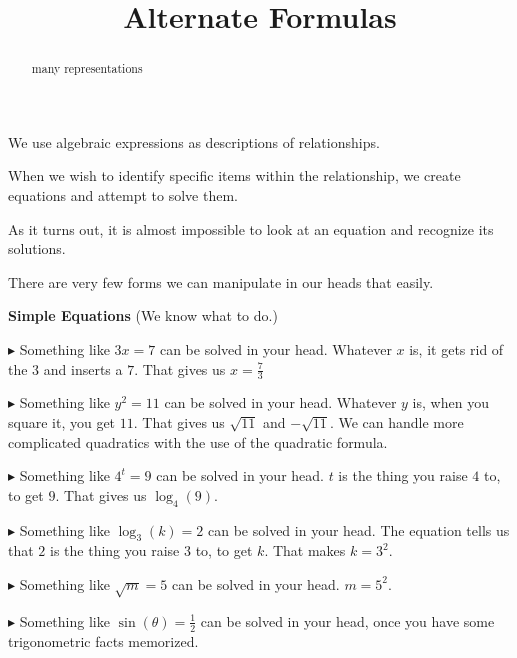 \documentclass{ximera}
\title{Alternate Formulas}
\begin{document}
\begin{abstract}
many representations
\end{abstract}
\maketitle





We use algebraic expressions as descriptions of relationships. 

When we wish to identify specific items within the relationship, we create equations and attempt to solve them. 

As it turns out, it is almost impossible to look at an equation and recognize its solutions.


There are very few forms we can manipulate in our heads that easily.



\begin{summary} \textbf{\textcolor{red!70!yellow}{Simple Equations}}  (We know what to do.)

$\blacktriangleright$ Something like $3x = 7$ can be solved in your head.  Whatever $x$ is, it gets rid of the $3$ and inserts a $7$.  That gives us $x =\frac{7}{3}$





$\blacktriangleright$ Something like $y^2 = 11$ can be solved in your head.  Whatever $y$ is, when you square it, you get $11$.  That gives us $\sqrt{11}$ and $-\sqrt{11}$.  We can handle more complicated  quadratics with the use of the quadratic formula.




$\blacktriangleright$ Something like $4^t = 9$ can be solved in your head.  $t$ is the thing you raise $4$ to, to get $9$.  That gives us $\log_4(9)$.



$\blacktriangleright$ Something like $\log_3(k) = 2$ can be solved in your head.  The equation tells us that $2$ is the thing you raise $3$ to, to get $k$.  That makes $k = 3^2$.



$\blacktriangleright$ Something like $\sqrt{m} = 5$ can be solved in your head.  $m = 5^2$.


$\blacktriangleright$ Something like $\sin(\theta) = \frac{1}{2}$ can be solved in your head, once you have some trigonometric facts memorized.


\end{summary}
\end{document}
